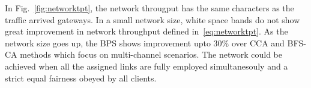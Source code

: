In Fig.~\ref{fig:networktpt}, the network througput has the same characters
as the traffic arrived gateways. In a small network size, white space bands
do not show great improvement in network throughput defined in~\ref{eq:networktpt}.
As the network size goes up, the BPS shows improvement upto 30\%
over CCA and BFS-CA methods which focus on multi-channel scenarios.
The network could be achieved when all the assigned links are fully employed
simultanesouly and a strict equal fairness obeyed by all clients.


